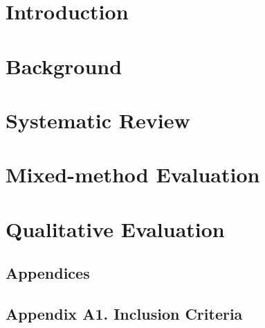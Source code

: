\documentclass[12pt,a4paper,twoside]{report}
\begin{document}
\tableofcontents
\listoffigures
\listoftables

\chapter{Introduction}


\chapter{Background}


\chapter{Systematic Review}


\chapter{Mixed-method Evaluation}


\chapter{Qualitative Evaluation}



\begin{appendices}
\chapter*{Appendices}
\section*{Appendix A1. Inclusion Criteria}

\clearpage


\end{appendices}
\end{document}
